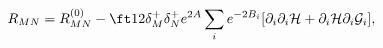 \begin{equation}
R_{MN}=R_{MN}^{(0)}-\ft12\delta_M^+\delta_N^+e^{2A}\sum_ie^{-2B_i}
[\partial_i\partial_i{\cal H}+\partial_i{\cal H}\partial_i{\cal G}_i],
\label{eq:rmnsplit}
\end{equation}

